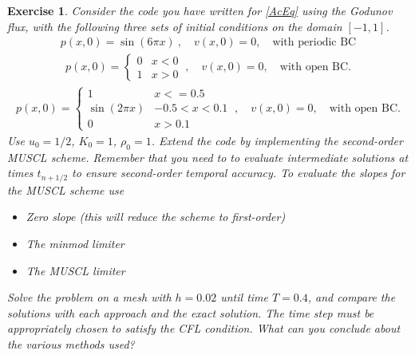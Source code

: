 \documentclass[10pt,letterpaper]{article}
\newcommand{\frb}[1]{ \left(  {#1} \right) }
\theoremstyle{break}
\newtheorem{exercise}{Exercise}
\begin{document}
\begin{exercise}
	Consider the code you have written for \eqref{AcEq} using the Godunov flux,
	with the following three sets of initial conditions on the domain $[-1,1]$.
	\begin{gather} \label{inData1}
		p(x,0)=\sin\frb{6\pi x}\ ,
		\quad
		v(x,0)=0, \quad \text{with periodic BC}
	\end{gather}%
	\begin{gather} \label{inData2}
		p(x,0)=\begin{cases}
			0 & x<0\\
			1 & x>0
		\end{cases}\ ,
		\quad
		v(x,0)=0, \quad \text{with open BC}.
	\end{gather}%
	\begin{gather} \label{inData3}
		p(x,0)=\begin{cases}
			1 & x<=0.5\\
			\sin\frb{2\pi x} & -0.5<x<0.1\\
			0 & x > 0.1
		\end{cases}\ ,
		\quad
		v(x,0)=0, \quad \text{with open BC}.
	\end{gather}%
	Use $u_{0}=1/2$, $K_{0}=1$, $\rho_{0}=1$. Extend the code by implementing the second-order MUSCL scheme.
	Remember that you need to to evaluate intermediate solutions at times $t_{n+1/2}$ to ensure second-order temporal accuracy.
	To evaluate the slopes for the MUSCL scheme use
	\begin{itemize}
	\item Zero slope (this will reduce the scheme to first-order)
	\item The minmod limiter
	\item The MUSCL limiter
	\end{itemize} 

	Solve the problem on a mesh with $h=0.02$ until time $T=0.4$, and compare the solutions with each approach and the exact solution.
	The time step must be appropriately chosen to satisfy the CFL condition. What can you conclude about the various methods used?
\end{exercise}
\end{document}
